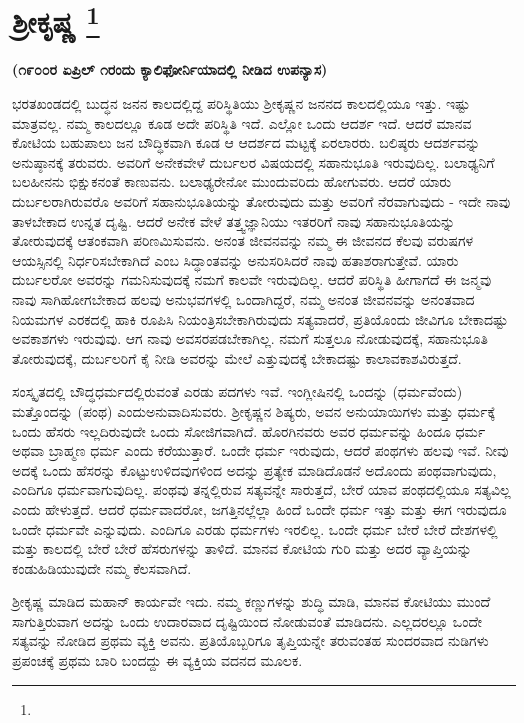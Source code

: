 
\chapter[ಶ‍್ರೀಕೃಷ್ಣ ]{ಶ‍್ರೀಕೃಷ್ಣ \protect\footnote{}}

\centerline{\textbf{(೧೯೦೦ರ ಏಪ್ರಿಲ್​ ೧ರಂದು ಕ್ಯಾಲಿಫೋರ್ನಿಯಾದಲ್ಲಿ ನೀಡಿದ ಉಪನ್ಯಾಸ)}}

ಭರತಖಂಡದಲ್ಲಿ ಬುದ್ಧನ ಜನನ ಕಾಲದಲ್ಲಿದ್ದ ಪರಿಸ್ಥಿತಿಯು ಶ‍್ರೀಕೃಷ್ಣನ ಜನನದ ಕಾಲದಲ್ಲಿಯೂ ಇತ್ತು. ಇಷ್ಟು ಮಾತ್ರವಲ್ಲ. ನಮ್ಮ ಕಾಲದಲ್ಲೂ ಕೂಡ ಅದೇ ಪರಿಸ್ಥಿತಿ ಇದೆ. ಎಲ್ಲೋ ಒಂದು ಆದರ್ಶ ಇದೆ. ಆದರೆ ಮಾನವ ಕೋಟಿಯ ಬಹುಪಾಲು ಜನ ಬೌದ್ಧಿಕವಾಗಿ ಕೂಡ ಆ ಆದರ್ಶದ ಮಟ್ಟಕ್ಕೆ ಏರಲಾರರು. ಬಲಿಷ್ಠರು ಆದರ್ಶವನ್ನು ಅನುಷ್ಠಾನಕ್ಕೆ ತರುವರು. ಅವರಿಗೆ ಅನೇಕವೇಳೆ ದುರ್ಬಲರ ವಿಷಯದಲ್ಲಿ ಸಹಾನುಭೂತಿ ಇರುವುದಿಲ್ಲ. ಬಲಾಢ್ಯನಿಗೆ ಬಲಹೀನನು ಭಿಕ್ಷುಕನಂತೆ ಕಾಣುವನು. ಬಲಾಢ್ಯರೇನೋ ಮುಂದುವರಿದು ಹೋಗುವರು. ಆದರೆ ಯಾರು ದುರ್ಬಲರಾಗಿರುವರೊ ಅವರಿಗೆ ಸಹಾನುಭೂತಿಯನ್ನು ತೋರುವುದು ಮತ್ತು ಅವರಿಗೆ ನೆರವಾಗುವುದು - ಇದೇ ನಾವು ತಾಳಬೇಕಾದ ಉನ್ನತ ದೃಷ್ಟಿ. ಆದರೆ ಅನೇಕ ವೇಳೆ ತತ್ತ್ವಜ್ಞಾನಿಯು ಇತರರಿಗೆ ನಾವು ಸಹಾನುಭೂತಿಯನ್ನು ತೋರುವುದಕ್ಕೆ ಆತಂಕವಾಗಿ ಪರಿಣಮಿಸುವನು. ಅನಂತ ಜೀವನವನ್ನು ನಮ್ಮ ಈ ಜೀವನದ ಕೆಲವು ವರುಷಗಳ ಆಯಸ್ಸಿನಲ್ಲಿ ನಿರ್ಧರಿಸಬೇಕಾಗಿದೆ ಎಂಬ ಸಿದ್ಧಾಂತವನ್ನು ಅನುಸರಿಸಿದರೆ ನಾವು ಹತಾಶರಾಗುತ್ತೇವೆ. ಯಾರು ದುರ್ಬಲರೋ ಅವರನ್ನು ಗಮನಿಸುವುದಕ್ಕೆ ನಮಗೆ ಕಾಲವೇ ಇರುವುದಿಲ್ಲ. ಆದರೆ ಪರಿಸ್ಥಿತಿ ಹೀಗಾಗದೆ ಈ ಜನ್ಮವು ನಾವು ಸಾಗಿಹೋಗಬೇಕಾದ ಹಲವು ಅನುಭವಗಳಲ್ಲಿ ಒಂದಾಗಿದ್ದರೆ, ನಮ್ಮ ಅನಂತ ಜೀವನವನ್ನು ಅನಂತವಾದ ನಿಯಮಗಳ ಎರಕದಲ್ಲಿ ಹಾಕಿ ರೂಪಿಸಿ ನಿಯಂತ್ರಿಸಬೇಕಾಗಿರುವುದು ಸತ್ಯವಾದರೆ, ಪ್ರತಿಯೊಂದು ಜೀವಿಗೂ ಬೇಕಾದಷ್ಟು ಅವಕಾಶಗಳು ಇರುವುವು. ಆಗ ನಾವು ಅವಸರಪಡಬೇಕಾಗಿಲ್ಲ. ನಮಗೆ ಸುತ್ತಲೂ ನೋಡುವುದಕ್ಕೆ, ಸಹಾನುಭೂತಿ ತೋರುವುದಕ್ಕೆ, ದುರ್ಬಲರಿಗೆ ಕೈ ನೀಡಿ ಅವರನ್ನು ಮೇಲೆ ಎತ್ತುವುದಕ್ಕೆ ಬೇಕಾದಷ್ಟು ಕಾಲಾವಕಾಶವಿರುತ್ತದೆ.

ಸಂಸ್ಕೃತದಲ್ಲಿ ಬೌದ್ಧಧರ್ಮದಲ್ಲಿರುವಂತೆ ಎರಡು ಪದಗಳು ಇವೆ. ಇಂಗ್ಲೀಷಿನಲ್ಲಿ ಒಂದನ್ನು  (ಧರ್ಮವೆಂದು) ಮತ್ತೊಂದನ್ನು  (ಪಂಥ) ಎಂದು\break ಅನುವಾದಿಸುವರು. ಶ‍್ರೀಕೃಷ್ಣನ ಶಿಷ್ಯರು, ಅವನ ಅನುಯಾಯಿಗಳು ಮತ್ತು ಧರ್ಮಕ್ಕೆ ಒಂದು ಹೆಸರು ಇಲ್ಲದಿರುವುದೇ ಒಂದು ಸೋಜಿಗವಾಗಿದೆ. ಹೊರಗಿನವರು ಅವರ ಧರ್ಮವನ್ನು ಹಿಂದೂ ಧರ್ಮ ಅಥವಾ ಬ್ರಾಹ್ಮಣ ಧರ್ಮ ಎಂದು ಕರೆಯುತ್ತಾರೆ. ಒಂದೇ ಧರ್ಮ ಇರುವುದು, ಆದರೆ ಪಂಥಗಳು ಹಲವು ಇವೆ. ನೀವು ಅದಕ್ಕೆ ಒಂದು ಹೆಸರನ್ನು ಕೊಟ್ಟು\break ಉಳಿದವುಗಳಿಂದ ಅದನ್ನು ಪ್ರತ್ಯೇಕ ಮಾಡಿದೊಡನೆ ಅದೊಂದು ಪಂಥವಾಗುವುದು, ಎಂದಿಗೂ ಧರ್ಮವಾಗುವುದಿಲ್ಲ. ಪಂಥವು ತನ್ನಲ್ಲಿರುವ ಸತ್ಯವನ್ನೇ ಸಾರುತ್ತದೆ, ಬೇರೆ ಯಾವ ಪಂಥದಲ್ಲಿಯೂ ಸತ್ಯವಿಲ್ಲ ಎಂದು ಹೇಳುತ್ತದೆ. ಆದರೆ ಧರ್ಮವಾದರೋ, ಜಗತ್ತಿನಲ್ಲೆಲ್ಲಾ ಹಿಂದೆ ಒಂದೇ ಧರ್ಮ ಇತ್ತು ಮತ್ತು ಈಗ ಇರುವುದೂ ಒಂದೇ ಧರ್ಮವೇ ಎನ್ನುವುದು. ಎಂದಿಗೂ ಎರಡು ಧರ್ಮಗಳು ಇರಲಿಲ್ಲ. ಒಂದೇ ಧರ್ಮ ಬೇರೆ ಬೇರೆ ದೇಶಗಳಲ್ಲಿ ಮತ್ತು ಕಾಲದಲ್ಲಿ ಬೇರೆ ಬೇರೆ ಹೆಸರುಗಳನ್ನು ತಾಳಿದೆ. ಮಾನವ ಕೋಟಿಯ ಗುರಿ ಮತ್ತು ಅದರ ವ್ಯಾಪ್ತಿಯನ್ನು ಕಂಡುಹಿಡಿಯುವುದೇ ನಮ್ಮ ಕೆಲಸವಾಗಿದೆ.

ಶ‍್ರೀಕೃಷ್ಣ ಮಾಡಿದ ಮಹಾನ್​ ಕಾರ್ಯವೇ ಇದು. ನಮ್ಮ ಕಣ್ಣುಗಳನ್ನು ಶುದ್ಧಿ ಮಾಡಿ, ಮಾನವ ಕೋಟಿಯು ಮುಂದೆ ಸಾಗುತ್ತಿರುವಾಗ ಅದನ್ನು ಒಂದು ಉದಾರವಾದ ದೃಷ್ಟಿಯಿಂದ ನೋಡುವಂತೆ ಮಾಡಿದನು. ಎಲ್ಲದರಲ್ಲೂ ಒಂದೇ ಸತ್ಯವನ್ನು ನೋಡಿದ ಪ್ರಥಮ ವ್ಯಕ್ತಿ ಅವನು. ಪ್ರತಿಯೊಬ್ಬರಿಗೂ ತೃಪ್ತಿಯನ್ನೇ ತರುವಂತಹ ಸುಂದರವಾದ ನುಡಿಗಳು ಪ್ರಪಂಚಕ್ಕೆ ಪ್ರಥಮ ಬಾರಿ ಬಂದದ್ದು ಈ ವ್ಯಕ್ತಿಯ ವದನದ ಮೂಲಕ.

